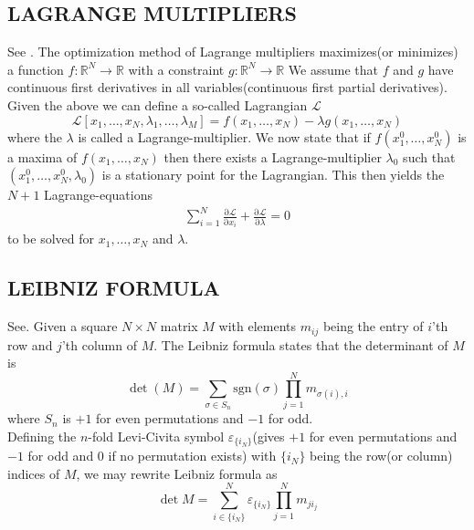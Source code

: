 \documentclass[a4paper, hidelinks, 10pt]{article}
\let\oldsubsection\subsection
\renewcommand{\subsection}[1]{\centering \oldsubsection{{#1}} \justifying}
\newcommand{\prtl}{\mathrm{\partial}} %
\begin{document}
\subsection{LAGRANGE MULTIPLIERS}
\label{sub:lagrange_multipliers}
    See \cite{calcVar,calcVarSpring}. The optimization method of Lagrange
    multipliers maximizes(or minimizes) a function
    $f:\mathbb{R}^N\rightarrow\mathbb{R}$ with a constraint
    $g:\mathbb{R}^N\rightarrow\mathbb{R}$ We assume that $f$ and $g$ have
    continuous first derivatives in all variables(continuous first partial
    derivatives). \\
    Given the above we can define a so-called Lagrangian
    $\mathcal{L}$
        \begin{equation}
            \mathcal{L}[x_1,\dots,x_N,\lambda_1,\dots,\lambda_M] =
            f(x_1,\dots,x_N) - \lambda g(x_1,\dots,x_N)
            \label{eq:lagrangian}
        \end{equation}
    where the $\lambda$ is called a Lagrange-multiplier. We now state that if
    $f(x^0_1,\dots,x^0_N)$ is a maxima of $f(x_1,\dots,x_N)$ then there exists
    a Lagrange-multiplier $\lambda_0$ such that
    $(x^0_1,\dots,x^0_N,\lambda_0)$ is a stationary point
    for the Lagrangian. This then yields the $N+1$ Lagrange-equations
        \begin{align}
            \sum^N_{i=1} \frac{\prtl\mathcal{L}}{\prtl x_i} +
            \frac{\prtl\mathcal{L}}{\prtl \lambda} = 0
            \label{eq:lagrangeEQ}
        \end{align}
    to be solved for $x_1,\dots,x_N$ and $\lambda$.

\subsection{LEIBNIZ FORMULA}
\label{sub:leibniz_formula}
    See\cite{encMat}. Given a square $N\times N$ matrix $M$ with elements
    $m_{ij}$ being the entry of $i$'th row and $j$'th column of $M$. The
    Leibniz formula states that the determinant of $M$ is
        \begin{equation}
            \det(M) = \sum_{\sigma\in
            S_n}\text{sgn}(\sigma)\prod^N_{j=1}m_{\sigma(i),i}
            \label{eq:Leibniz}
        \end{equation}
    where $S_n$ is $+1$ for even permutations and $-1$ for odd.\\
    Defining the $n$-fold Levi-Civita symbol $\varepsilon_{\{i_N\}}$(gives $+1$
    for even permutations and $-1$ for odd and $0$ if no permutation exists)
    with $\{i_N\}$ being the row(or column) indices of $M$, we may rewrite
    Leibniz formula as
        \begin{equation}
            \det{M} =
            \sum^N_{i\in\{i_N\}}\varepsilon_{\{i_N\}}\prod^N_{j=1}m_{ji_j}
            \label{eq:LeviLeibniz}
        \end{equation}
\end{document}
